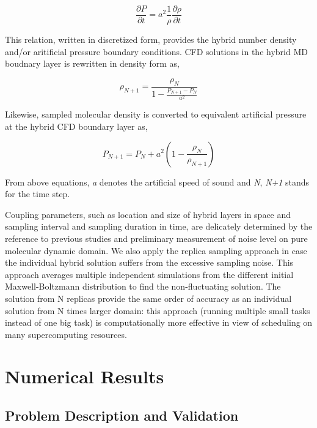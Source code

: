 \documentclass[]{aiaa-tc}%
\begin{document}
\begin{equation}
\frac{\partial P}{\partial t} = {a}^2 \frac{1}{\rho} \frac{\partial \rho}{\partial t}
\label{eq:Ar_Co1}
\end{equation}

This relation, written in discretized form, provides the hybrid number density
and/or aritificial pressure boundary conditions. CFD solutions in the hybrid 
MD boudnary layer is rewritten in density form as,

\begin{equation}
\rho_{N+1} = \frac{\rho_{N}}{1 - \frac{P_{N+1} - P_{N}}{a^2}}
\label{eq:Ar_Co2}
\end{equation}

Likewise, sampled molecular density is converted to equivalent artificial pressure
at the hybrid CFD boundary layer as,

\begin{equation}
P_{N+1} = P_{N} + a^2 ( 1 - \frac{\rho_{N}}{\rho_{N+1}} )
\label{eq:Ar_Co3}
\end{equation}

From above equations, {\it{a}} denotes the artificial speed of sound and {\it{N}},
{\it{N+1}} stands for the time step.

Coupling parameters, such as location and size of hybrid layers in space and 
sampling interval and sampling duration in time, are delicately determined 
by the reference to previous studies\cite{Nie,Yen,Liu,Hadjicon2,Werder,Flekkoy,Delgado1}
and preliminary measurement of noise level on pure molecular dynamic domain.
We also apply the replica sampling approach\cite{REMD} in case the individual 
hybrid solution suffers from the excessive sampling noise. This approach averages 
multiple independent simulations from the different initial Maxwell-Boltzmann 
distribution to find the non-fluctuating solution. The solution from N replicas 
provide the same order of accuracy as an individual solution from N times larger 
domain: this approach (running multiple small tasks instead of one big task) is 
computationally more effective in view of scheduling on many supercomputing
resources.


\section{Numerical Results}
\label{sec:result}

\subsection{Problem Description and Validation}
\label{sec:result_val}
\end{document}
